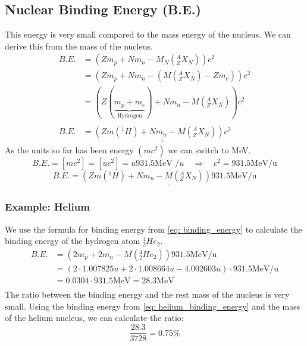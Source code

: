 \subsection{Nuclear Binding Energy (B.E.)}
This energy is very small compared to the mass energy of the nucleus. We can derive this from the mass of the nucleus. 
\begin{align}
    B.E. &= \left(Zm_{p} + Nm_{n} - M_{N}\left(_{Z}^{A}X_{N}\right)\right) c^2 \\
    &= \left(Zm_{p} + Nm_{n} - \left(M\left(_{Z}^{A}X_{N}\right) - Zm_e\right)\right) c^2 \\ 
    &= \left(Z(\underbrace{m_{p} + m_e}_{\text{Hydrogen}}) + Nm_{n} - M\left(_{Z}^{A}X_{N}\right)\right) c^2 \\ \\
   B.E. &= \underline{\underline{\left(Zm\left(^{1}H\right) + Nm_{n} - M\left(_{Z}^{A}X_{N}\right)\right) c^2}}
\end{align}
As the units so far has been energy $(mc^2)$ we can switch to MeV. 
\begin{equation}
B.E. = \left[mc^2\right] = \left[uc^2\right] = u931.5\text{MeV /}u \quad ⇒ \quad c^2 = 931.5 \text{MeV/u}
\end{equation}
\begin{equation}\label{eq: binding_energy}
B.E. = \underline{\underline{\left(Zm\left(^{1}H\right) + Nm_{n} - M\left(_{Z}^{A}X_{N}\right)\right) 931.5 \text{MeV/u}}}
\end{equation}

\subsubsection{Example: Helium }
We use the formula for binding energy from \cref{eq: binding_energy} to calculate the binding energy of the hydrogen atom $_{2}^{4}He_{2}$.
\begin{align}
B.E. &= \left(2m_p + 2m_n - M\left(_{2}^{4}He_{2}\right)\right) 931.5 \text{MeV/u} \\
&= \left(2 ⋅ 1.007825u + 2 ⋅ 1.008664u - 4.002603u\right) ⋅ 931.5 \text{MeV/u} \\
&= \underline{\underline{0.0304 ⋅  931.5 \text{MeV} = 28.3 \text{MeV}}}\label{eq: helium_binding_energy}
\end{align}
The ratio between the binding energy and the rest mass of the nucleus is very small. Using the binding energy from \cref{eq: helium_binding_energy} and the mass of the helium nucleus, we can calculate the ratio:
\begin{equation}
\frac{28.3}{3728} = 0.75\%
\end{equation}
